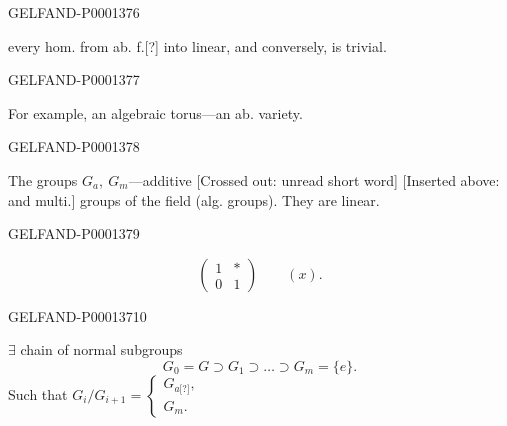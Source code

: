 \begin{GelfandAdjacentEvidence}{GELFAND-P000137}{6}

 every hom. from ab. f.[?] into linear, and conversely, is trivial.
\end{GelfandAdjacentEvidence}
\begin{GelfandAdjacentEvidence}{GELFAND-P000137}{7}

For example, an algebraic torus—an ab. variety.
\end{GelfandAdjacentEvidence}
\begin{GelfandAdjacentEvidence}{GELFAND-P000137}{8}


The groups $G_a,\ G_m$—additive [Crossed out: unread short word] [Inserted above: and multi.] groups of the field (alg. groups). They are linear.
\end{GelfandAdjacentEvidence}
\begin{GelfandAdjacentEvidence}{GELFAND-P000137}{9}

\begin{equation*}
\begin{pmatrix}1&*\\0&1\end{pmatrix}\qquad (x).
\end{equation*}
\end{GelfandAdjacentEvidence}
\begin{GelfandAdjacentEvidence}{GELFAND-P000137}{10}

 $\exists$ chain of normal subgroups
\begin{equation*}
G_0=G\supset G_1\supset\ldots\supset G_m=\{e\}.
\end{equation*}
Such that $G_i/G_{i+1}=\begin{cases}G_{a\text{[?]}},\\G_m.\end{cases}$
\end{GelfandAdjacentEvidence}

